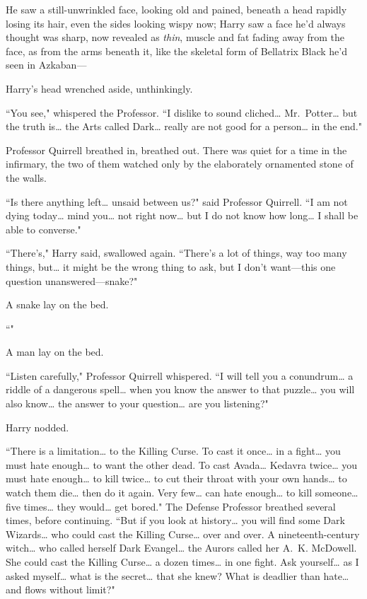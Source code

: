 He saw a still-unwrinkled face, looking old and pained, beneath a head rapidly losing its hair, even the sides looking wispy now; Harry saw a face he'd always thought was sharp, now revealed as \emph{thin}, muscle and fat fading away from the face, as from the arms beneath it, like the skeletal form of Bellatrix Black he'd seen in Azkaban—

Harry's head wrenched aside, unthinkingly.

``You see," whispered the Professor. ``I dislike to sound cliched{\ldots} Mr.~Potter{\ldots} but the truth is{\ldots} the Arts called Dark{\ldots} really are not good for a person{\ldots} in the end."

Professor Quirrell breathed in, breathed out. There was quiet for a time in the infirmary, the two of them watched only by the elaborately ornamented stone of the walls.

``Is there anything left{\ldots} unsaid between us?" said Professor Quirrell. ``I am not dying today{\ldots} mind you{\ldots} not right now{\ldots} but I do not know how long{\ldots} I shall be able to converse."

``There's," Harry said, swallowed again. ``There's a lot of things, way too many things, but{\ldots} it might be the wrong thing to ask, but I don't want—this one question unanswered—snake?"

A snake lay on the bed.

``"

A man lay on the bed.

``Listen carefully," Professor Quirrell whispered. ``I will tell you a conundrum{\ldots} a riddle of a dangerous spell{\ldots} when you know the answer to that puzzle{\ldots} you will also know{\ldots} the answer to your question{\ldots} are you listening?"

Harry nodded.

``There is a limitation{\ldots} to the Killing Curse. To cast it once{\ldots} in a fight{\ldots} you must hate enough{\ldots} to want the other dead. To cast Avada{\ldots} Kedavra twice{\ldots} you must hate enough{\ldots} to kill twice{\ldots} to cut their throat with your own hands{\ldots} to watch them die{\ldots} then do it again. Very few{\ldots} can hate enough{\ldots} to kill someone{\ldots} five times{\ldots} they would{\ldots} get bored." The Defense Professor breathed several times, before continuing. ``But if you look at history{\ldots} you will find some Dark Wizards{\ldots} who could cast the Killing Curse{\ldots} over and over. A nineteenth-century witch{\ldots} who called herself Dark Evangel{\ldots} the Aurors called her A.~K. McDowell. She could cast the Killing Curse{\ldots} a dozen times{\ldots} in one fight. Ask yourself{\ldots} as I asked myself{\ldots} what is the secret{\ldots} that she knew? What is deadlier than hate{\ldots} and flows without limit?"

